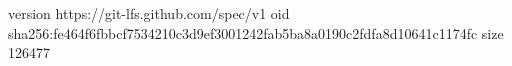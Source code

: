 version https://git-lfs.github.com/spec/v1
oid sha256:fe464f6fbbcf7534210c3d9ef3001242fab5ba8a0190c2fdfa8d10641c1174fc
size 126477
